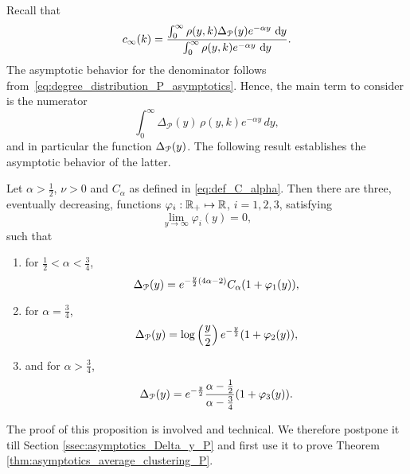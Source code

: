 Recall that
\[
	c_\infty(k) = \frac{\int_0^\infty \rho(y,k) \Delta_{{\mathcal P}}(y) e^{-\alpha y} \operatorname{\, \mathrm{d}\hspace{-2pt}} y}{\int_0^\infty \rho(y,k) e^{-\alpha y} \operatorname{\, \mathrm{d}\hspace{-2pt}} y}.
\]
The asymptotic behavior for the denominator follows from~\eqref{eq:degree_distribution_P_asymptotics}. Hence, the main term to consider is the numerator
\[
	\int_0^{\infty} \Delta_{\mathcal{P}}(y) \, \rho(y,k) e^{-\alpha y} \, dy,
\]
and in particular the function $\Delta_{{\mathcal P}}(y)$. The following result establishes the asymptotic behavior of the latter.

\begin{proposition}\label{prop:asymptotics_Delta_y_P}
Let $\alpha > \frac{1}{2}$, $\nu > 0$ and $C_\alpha$ as defined in \eqref{eq:def_C_alpha}. Then there are three, eventually decreasing, functions $\varphi_i : {\mathbb R}_+ \mapsto {\ensuremath{\mathbb R}}$, $i = 1,2,3$, satisfying
\[
	\lim_{y \to \infty} \varphi_i(y) = 0, 
\]
such that 
\begin{enumerate}
\item for $\frac{1}{2} < \alpha < \frac{3}{4}$,
\[
	\Delta_{{\mathcal P}}(y) = e^{-\frac{y}{2}(4\alpha - 2)} C_\alpha (1 + \varphi_1(y)),
\]
\item for $\alpha = \frac{3}{4}$,
\[
	\Delta_{{\mathcal P}}(y) = \log\left(\frac{y}{2}\right)e^{-\frac{y}{2}}(1 + \varphi_2(y)),
\]
\item and for $\alpha > \frac{3}{4}$,
\[
	\Delta_{{\mathcal P}}(y) = e^{-\frac{y}{2}} \frac{\alpha - \frac{1}{2}}{\alpha - \frac{3}{4}} (1 + \varphi_3(y)).
\]
\end{enumerate}
\end{proposition}

The proof of this proposition is involved and technical. We therefore postpone it till Section \ref{ssec:asymptotics_Delta_y_P} and first use it to prove Theorem \ref{thm:asymptotics_average_clustering_P}. 

